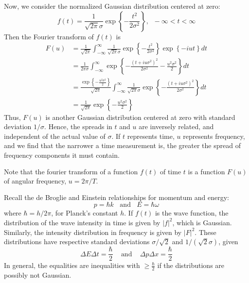 \documentclass[12pt, a4paper, oneside, openright, titlepage]{book}
\begin{document}
Now, we consider the normalized Gaussian distribution centered at zero: \begin{equation*}
    f(t) = \frac{1}{\sqrt{2\pi}\sigma}\exp\left\{-\frac{t^2}{2\sigma^2}\right\},\;\;-\infty < t < \infty
\end{equation*}
Then the Fourier transform of $f(t)$ is \begin{align*}
    F(u) &= \frac{1}{\sqrt{2\pi}}\int_{-\infty}^{\infty}\frac{1}{\sqrt{2\pi}\sigma}\exp\left\{-\frac{t^2}{2\sigma^2}\right\}\exp\left\{-iut\right\}dt \\
    &= \frac{1}{2\pi\sigma}\int_{-\infty}^{\infty}\exp\left\{-\frac{(t+iu\sigma^2)^2}{2\sigma^2}-\frac{u^2\sigma^2}{2}\right\}dt \\
    &= \frac{\exp\left\{-\frac{u^2\sigma^2}{2}\right\}}{\sqrt{2\pi}}\int_{-\infty}^{\infty}\frac{1}{\sqrt{2\pi}\sigma}\exp\left\{-\frac{(t+iu\sigma^2)^2}{2\sigma^2}\right\}dt \\
    &= \frac{1}{\sqrt{2\pi}}\exp\left\{-\frac{u^2\sigma^2}{2}\right\}
\end{align*}
Thus, $F(u)$ is another Gaussian distribution centered at zero with standard deviation $1/\sigma$. Hence, the spreads in $t$ and $u$ are inversely related, and independent of the actual value of $\sigma$. If $t$ represents time, $u$ represents frequency, and we find that the narrower a time measurement is, the greater the spread of frequency components it must contain.

\begin{note}
    Note that the fourier transform of a function $f(t)$ of time $t$ is a function $F(u)$ of angular frequency, $u = 2\pi/T$.
\end{note}

Recall the de Broglie and Einstein relationships for momentum and energy: \begin{equation*}
    p = \hbar k\;\;\text{ and }\;\;E=\hbar\omega
\end{equation*}
where $\hbar = h/2\pi$, for Planck's constant $h$. If $f(t)$ is the wave function, the distribution of the wave intensity in time is given by $|f|^2$, which is Gaussian. Similarly, the intensity distribution in frequency is given by $|F|^2$. These distributions have respective standard deviations $\sigma/\sqrt{2}$ and $1/(\sqrt{2}\sigma)$, given \begin{equation*}
    \Delta E\Delta t = \frac{\hbar}{2}\;\;\;\text{ and }\;\;\;\Delta p\Delta x = \frac{\hbar}{2}
\end{equation*}
In general, the equalities are inequalities with $\geq \frac{\hbar}{2}$ if the distributions are possibly not Gaussian.
\end{document}

